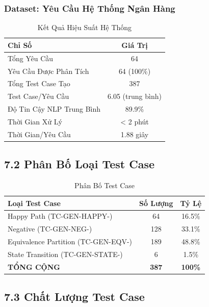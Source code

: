 \documentclass[14pt,a4paper]{article}
\begin{document}
\subsubsection{Dataset: Yêu Cầu Hệ Thống Ngân Hàng}

\begin{table}[h]
\centering
\begin{tabular}{|l|c|}
\hline
\textbf{Chỉ Số} & \textbf{Giá Trị} \\
\hline
Tổng Yêu Cầu & 64 \\
\hline
Yêu Cầu Được Phân Tích & 64 (100\%) \\
\hline
Tổng Test Case Tạo & 387 \\
\hline
Test Case/Yêu Cầu & 6.05 (trung bình) \\
\hline
Độ Tin Cậy NLP Trung Bình & 89.9\% \\
\hline
Thời Gian Xử Lý & < 2 phút \\
\hline
Thời Gian/Yêu Cầu & 1.88 giây \\
\hline
\end{tabular}
\caption{Kết Quả Hiệu Suất Hệ Thống}
\end{table}

\subsection{7.2 Phân Bố Loại Test Case}

\begin{table}[h]
\centering
\begin{tabular}{|l|c|c|}
\hline
\textbf{Loại Test Case} & \textbf{Số Lượng} & \textbf{Tỷ Lệ} \\
\hline
Happy Path (TC-GEN-HAPPY-\*) & 64 & 16.5\% \\
\hline
Negative (TC-GEN-NEG-\*) & 128 & 33.1\% \\
\hline
Equivalence Partition (TC-GEN-EQV-\*) & 189 & 48.8\% \\
\hline
State Transition (TC-GEN-STATE-\*) & 6 & 1.5\% \\
\hline
\textbf{TỔNG CỘNG} & \textbf{387} & \textbf{100\%} \\
\hline
\end{tabular}
\caption{Phân Bố Test Case}
\end{table}

\subsection{7.3 Chất Lượng Test Case}
\end{document}
